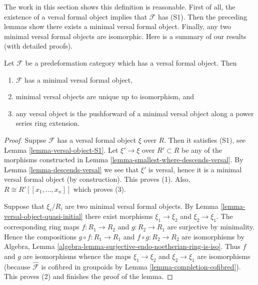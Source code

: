 \noindent
The work in this section shows this definition is reasonable.
First of all, the existence of a versal formal object implies that
$\mathcal{F}$ has (S1). Then the preceding lemmas
show there exists a minimal versal formal object. Finally, any
two minimal versal formal objects are isomorphic. Here is a summary
of our results (with detailed proofs).

\begin{lemma}
\label{lemma-minimal-versal}
Let $\mathcal{F}$ be a predeformation category which
has a versal formal object. Then
\begin{enumerate}
\item $\mathcal{F}$ has a minimal versal formal object,
\item minimal versal objects are unique up to isomorphism, and
\item any versal object is the pushforward of a minimal versal
object along a power series ring extension.
\end{enumerate}
\end{lemma}

\begin{proof}
Suppse $\mathcal{F}$ has a versal formal object $\xi$ over $R$.
Then it satisfies (S1), see
Lemma \ref{lemma-versal-object-S1}.
Let $\xi' \to \xi$ over $R' \subset R$ be any of the morphisms constructed in
Lemma \ref{lemma-smallest-where-descends-versal}.
By
Lemma \ref{lemma-descends-versal}
we see that $\xi'$ is versal, hence it is a minimal versal formal
object (by construction). This proves (1).
Also, $R \cong R'[[x_1, \ldots, x_n]]$ which proves (3).

\medskip\noindent
Suppose that $\xi_i/R_i$ are two minimal versal formal objects. By
Lemma \ref{lemma-versal-object-quasi-initial}
there exist morphisms $\xi_1 \to \xi_2$ and $\xi_2 \to \xi_1$.
The corresponding ring maps $f : R_1 \to R_2$ and $g : R_2 \to R_1$
are surjective by minimality. Hence the compositions
$g \circ f : R_1 \to R_1$ and $f \circ g : R_2 \to R_2$ are
isomorphisms by
Algebra, Lemma \ref{algebra-lemma-surjective-endo-noetherian-ring-is-iso}.
Thus $f$ and $g$ are isomorphisms whence the maps
$\xi_1 \to \xi_2$ and $\xi_2 \to \xi_1$ are isomorphisms
(because $\widehat{\mathcal{F}}$ is cofibred in groupoids by
Lemma \ref{lemma-completion-cofibred}). This proves (2) and
finishes the proof of the lemma.
\end{proof}









